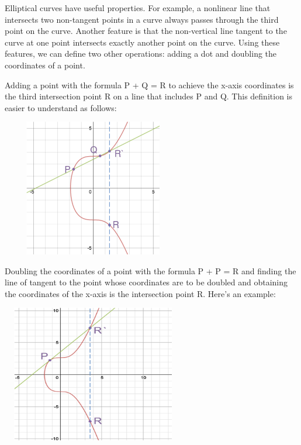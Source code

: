 \begin{flushleft}
Elliptical curves have useful properties. For example, a nonlinear line that intersects two non-tangent points in a curve always passes through the third point on the curve. Another feature is that the non-vertical line tangent to the curve at one point intersects exactly another point on the curve. Using these features, we can define two other operations: adding a dot and doubling the coordinates of a point.\newline

Adding a point with the formula P + Q = R to achieve the x-axis coordinates is the third intersection point R on a line that includes P and Q. This definition is easier to understand as follows:
\end{flushleft}

\centering\includegraphics[width=8cm, height=6cm]{charts/2.png}

\begin{flushleft}
Doubling the coordinates of a point with the formula P + P = R and finding the line of tangent to the point whose coordinates are to be doubled and obtaining the coordinates of the x-axis is the intersection point R. Here's an example:

\end{flushleft}

\centering\includegraphics[width=8cm, height=6cm]{charts/3.png}

